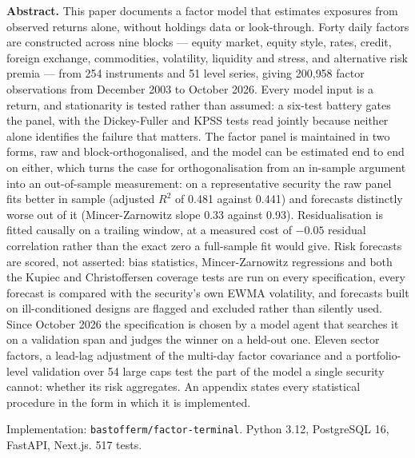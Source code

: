 \documentclass[11pt,a4paper]{article}
\newcommand{\code}[1]{\texttt{\small #1}}
\begin{document}
\begin{titlepage}
\begin{minipage}{\textwidth}
\small
\textbf{\sffamily\color{navy}Abstract.}
This paper documents a factor model that estimates exposures from observed returns
alone, without holdings data or look-through. Forty daily factors are constructed
across nine blocks --- equity market, equity style, rates, credit, foreign exchange,
commodities, volatility, liquidity and stress, and alternative risk premia --- from
254 instruments and 51 level series, giving 200{,}958 factor observations from
December 2003 to October 2026. Every model input is a return, and stationarity is
tested rather than assumed: a six-test battery gates the panel, with the
Dickey-Fuller and KPSS tests read jointly because neither alone identifies the
failure that matters. The factor panel is maintained in two forms, raw and
block-orthogonalised, and the model can be estimated end to end on either, which
turns the case for orthogonalisation from an in-sample argument into an
out-of-sample measurement: on a representative security the raw panel fits better
in sample (adjusted $R^2$ of 0.481 against 0.441) and forecasts distinctly worse out
of it (Mincer-Zarnowitz slope 0.33 against 0.93). Residualisation is fitted causally
on a trailing window, at a measured cost of $-0.05$ residual correlation rather than
the exact zero a full-sample fit would give. Risk forecasts are scored, not
asserted: bias statistics, Mincer-Zarnowitz regressions and both the Kupiec and
Christoffersen coverage tests are run on every specification, every forecast is
compared with the security's own EWMA volatility, and forecasts built on
ill-conditioned designs are flagged and excluded rather than silently used. Since
October 2026 the specification is chosen by a model agent that searches it on a
validation span and judges the winner on a held-out one. Eleven sector factors, a
lead-lag adjustment of the multi-day factor covariance and a portfolio-level
validation over 54 large caps test the part of the model a single security cannot:
whether its risk aggregates. An appendix states every
statistical procedure in the form in which it is implemented.
\end{minipage}

\vfill
{\footnotesize\color{ink}
Implementation: \code{bastofferm/factor-terminal}. Python 3.12, PostgreSQL 16,
FastAPI, Next.js. 517 tests.\par}
\end{titlepage}

\newpage
{}
\setcounter{tocdepth}{2}
{\hypersetup{linkcolor=ink}
\tableofcontents}
\newpage
{}
\end{document}
